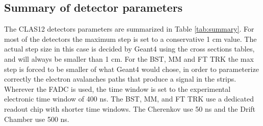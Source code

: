 \subsection{Summary of detector parameters}

The CLAS12 detectors parameters are summarized in Table \ref{tab:summary}.
For most of the detectors the maximum step is set to a conservative 1 cm value. The actual step
size in this case is decided by Geant4 using the cross sections tables, and will always be smaller
than 1 cm. For the BST, MM and FT TRK the max step is forced to be smaller of what Geant4 would chose, in order
to parameterize correctly the electron avalanches paths that produce a signal in the strips.
Wherever the FADC is used, the time window
is set to the experimental electronic time window of 400 ns. The BST, MM, and FT TRK use a dedicated
readout chip with shorter time windows. The Cherenkov use 50 ns and the Drift Chamber use 500 ns.

